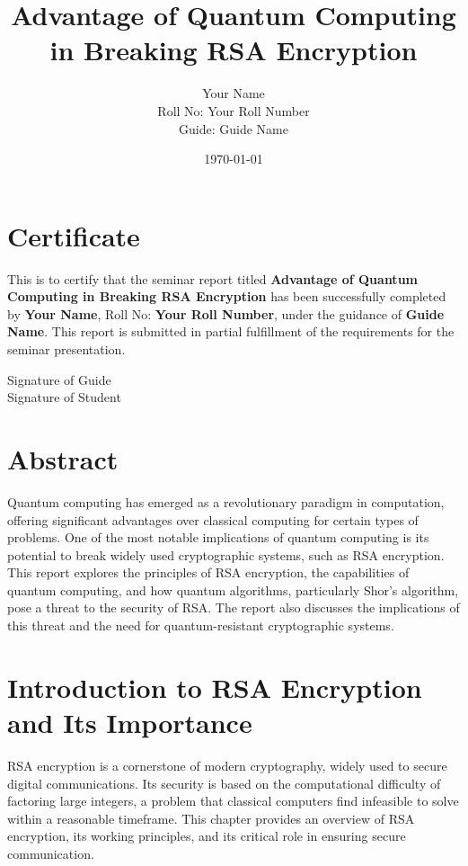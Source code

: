 \documentclass[12pt,a4paper]{report}
\title{Advantage of Quantum Computing in Breaking RSA Encryption}
\author{Your Name \\ Roll No: Your Roll Number \\ Guide: Guide Name}
\date{\today}
\begin{document}
\maketitle

\chapter*{Certificate}
This is to certify that the seminar report titled \textbf{Advantage of Quantum Computing in Breaking RSA Encryption} has been successfully completed by \textbf{Your Name}, Roll No: \textbf{Your Roll Number}, under the guidance of \textbf{Guide Name}. This report is submitted in partial fulfillment of the requirements for the seminar presentation.

\vspace{2cm}
\begin{flushright}
Signature of Guide \\
Signature of Student
\end{flushright}

\newpage

\tableofcontents
\newpage

\chapter*{Abstract}
Quantum computing has emerged as a revolutionary paradigm in computation, offering significant advantages over classical computing for certain types of problems. One of the most notable implications of quantum computing is its potential to break widely used cryptographic systems, such as RSA encryption. This report explores the principles of RSA encryption, the capabilities of quantum computing, and how quantum algorithms, particularly Shor's algorithm, pose a threat to the security of RSA. The report also discusses the implications of this threat and the need for quantum-resistant cryptographic systems.

\chapter{Introduction to RSA Encryption and Its Importance}
RSA encryption is a cornerstone of modern cryptography, widely used to secure digital communications. Its security is based on the computational difficulty of factoring large integers, a problem that classical computers find infeasible to solve within a reasonable timeframe. This chapter provides an overview of RSA encryption, its working principles, and its critical role in ensuring secure communication.
\end{document}
